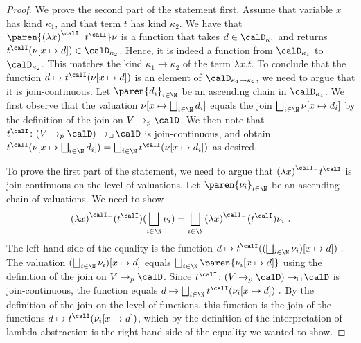 \documentclass[../../diss.tex]{subfiles}
\begin{document}
\begin{proof}
    We prove the second part of the statement first.
    Assume that variable $x$ has kind $\kappa_1$, and that term $t$ has kind $\kappa_2$.
    We have that $\paren{{(\lambda x)}^\interpretationt t^\interpretation} \val$ is a function that takes $d \in \domain{\kappa_1}$ and returns $t^\interpretation (\val[x \mapsto d]) \in \domain{\kappa_2}$.
    Hence, it is indeed a function from $\domain{\kappa_1}$ to $\domain{\kappa_2}$.
    This matches the kind $\kappa_1 \to \kappa_2$ of the term $\lambda x. t$.
    To conclude that the function  $d \mapsto t^\interpretation (\val[x \mapsto d])$ is an element of $\domain{\kappa_1 \to \kappa_2}$, we need to argue that it is join-continuous.
    Let ${\paren{d_i}}_{i \in \N}$ be an ascending chain in $\domain{\kappa_1}$.
    We first observe that the valuation $\val [ x \mapsto \bigsqcup_{i \in \N} d_i]$ equals the join $\bigsqcup_{i \in \N} \val [ x \mapsto d_i]$ by the definition of the join on $V \pto \domain$.
    We then note that $t^\interpretation \colon (V \pto \domain) \cto \domain$ is join-continuous, and obtain $t^\interpretation (\val[x \mapsto \bigsqcup_{i \in \N} d_i]) = \bigsqcup_{ i \in \N} t^\interpretation (\val[x \mapsto d_i])$ as desired.

    To prove the first part of the statement, we need to argue that ${(\lambda x)}^\interpretationt t^\interpretation$ is join-continuous on the level of valuations.
    Let ${\paren{\val_i}}_{i \in \N}$ be an ascending chain of valuations.
    We need to show
    \[
        {(\lambda x)}^\interpretationt (t^\interpretation) ( \bigsqcup_{i \in \N} \val_i)
        =
        \bigsqcup_{i \in \N} {(\lambda x)}^\interpretationt (t^\interpretation) \val_i
        \ .
    \]
    The left-hand side of the equality is the function
    \(
        d \mapsto t^\interpretation ( ( \bigsqcup_{i \in \N} \val_i ) [ x \mapsto d] )
        \ .
    \)
    The valuation \( (\bigsqcup_{i \in \N} \val_i ) [ x \mapsto d] \) equals \( \bigsqcup_{i \in \N} \paren{ \val_i [x \mapsto d]} \) using the definition of the join on $V \pto \domain$.
    Since $t^\interpretation \colon (V \pto \domain) \cto \domain$ is join-continuous, the function equals
    \(
        d \mapsto \bigsqcup_{i \in \N} t^\interpretation ( \val_i [ x \mapsto d] )
        \ .
    \)
    By the definition of the join on the level of functions, this function is the join of the functions $d \mapsto t^\interpretation ( \val_i [ x \mapsto d] )$, which by the definition of the interpretation of lambda abstraction is the right-hand side of the equality we wanted to show.
\end{proof}
\end{document}
